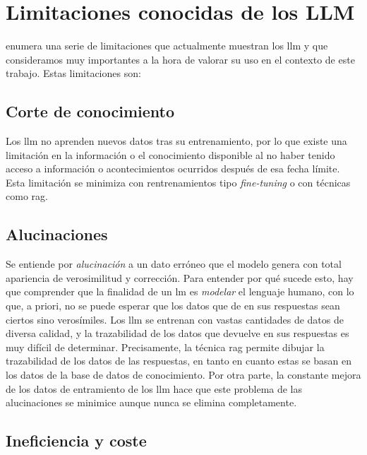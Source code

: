\section{Limitaciones conocidas de los LLM}
\label{sec:limitaciones_llm}

\cite{arunbijiRAGVsFinetuning} enumera una serie de limitaciones que actualmente muestran los \gls{llm} y que consideramos muy importantes a la hora de valorar su uso en el contexto de este trabajo. Estas limitaciones son:

\subsection{Corte de conocimiento}

Los \gls{llm} no aprenden nuevos datos tras su entrenamiento, por lo que existe una limitación en la información o el conocimiento disponible al no haber tenido acceso a información o acontecimientos ocurridos después de esa fecha límite. Esta limitación se minimiza con rentrenamientos tipo \emph{fine-tuning} o con técnicas como \gls{rag}.

\subsection{Alucinaciones}
\label{sec:alucinaciones}

Se entiende por \emph{alucinación} a un dato erróneo que el modelo genera con total apariencia de verosimilitud y corrección. Para entender por qué sucede esto, hay que comprender que la finalidad de un \gls{lm} es \emph{modelar} el lenguaje humano, con lo que, a priori, no se puede esperar que los datos que de en sus respuestas sean ciertos sino verosímiles. Los \gls{llm} se entrenan con vastas cantidades de datos de diversa calidad, y la trazabilidad de los datos que devuelve en sus respuestas es muy difícil de determinar. Precisamente, la técnica \gls{rag} permite dibujar la trazabilidad de los datos de las respuestas, en tanto en cuanto estas se basan en los datos de la base de datos de conocimiento. Por otra parte, la constante mejora de los datos de entramiento de los \gls{llm} \citep{gunasekarTextbooksAreAll2023} hace que este problema de las alucinaciones se minimice aunque nunca se elimina completamente.

\subsection{Ineficiencia y coste}

